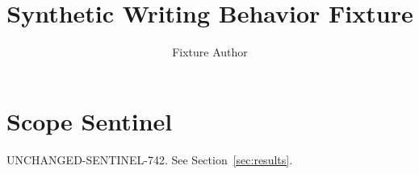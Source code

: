 \documentclass[sigconf,nonacm]{acmart}
\title{Synthetic Writing Behavior Fixture}
\author{Fixture Author}
\affiliation{\institution{Test Institution}\city{Test City}\country{Test Country}}
\newcommand{\PreserveSentinel}{UNCHANGED-SENTINEL-742}
\begin{document}
\maketitle


\section{Scope Sentinel}\label{sec:sentinel}
\PreserveSentinel. See Section~\ref{sec:results}.


\end{document}
